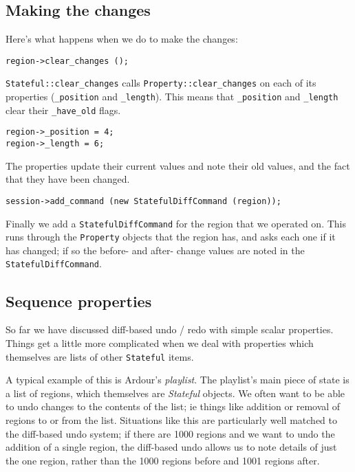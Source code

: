 \documentclass[10pt,a4paper]{book}
\newcommand{\code}[1]{\texttt{#1}}
\begin{document}
\subsection{Making the changes}

Here's what happens when we do to make the changes:

\begin{lstlisting}
region->clear_changes ();
\end{lstlisting}

\code{Stateful::clear\_changes} calls \code{Property::clear\_changes}
on each of its properties (\code{\_position} and \code{\_length}).
This means that \code{\_position} and \code{\_length} clear their
\code{\_have\_old} flags.

\begin{lstlisting}
region->_position = 4;
region->_length = 6;
\end{lstlisting}

The properties update their current values and note their old values,
and the fact that they have been changed.

\begin{lstlisting}
session->add_command (new StatefulDiffCommand (region));
\end{lstlisting}

Finally we add a \code{StatefulDiffCommand} for the region that we
operated on.  This runs through the \code{Property} objects that the
region has, and asks each one if it has changed; if so the before- and
after- change values are noted in the \code{StatefulDiffCommand}.


\subsection{Sequence properties}

So far we have discussed diff-based undo / redo with simple scalar
properties.  Things get a little more complicated when we deal with
properties which themselves are lists of other \code{Stateful} items.

A typical example of this is Ardour's \emph{playlist}.  The playlist's
main piece of state is a list of regions, which themselves are
\emph{Stateful} objects.  We often want to be able to undo changes to
the contents of the list; ie things like addition or removal of
regions to or from the list.  Situations like this are particularly
well matched to the diff-based undo system; if there are 1000 regions
and we want to undo the addition of a single region, the diff-based
undo allows us to note details of just the one region, rather than the
1000 regions before and 1001 regions after.
\end{document}
